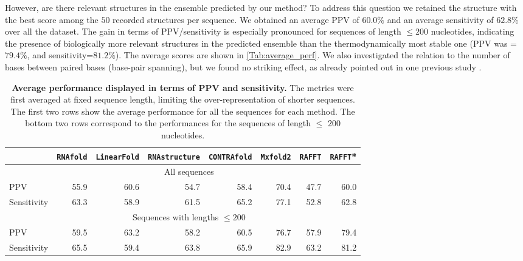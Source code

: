 However, are there relevant structures in the ensemble predicted by our method? To address this question we retained the structure with the best score among the $50$ recorded structures per sequence. We obtained an average \ac{PPV} of $60.0\%$ and an average sensitivity of $62.8\%$ over all the dataset. The gain in terms of \ac{PPV}/sensitivity is especially pronounced for sequences of length $\leq 200$ nucleotides, indicating the presence of biologically more relevant structures in the predicted ensemble than the thermodynamically most stable one (\ac{PPV} was =$79.4\%$, and sensitivity=$81.2\%$). The average scores are shown in \autoref{Tab:average_perf}. We also investigated the relation to the number of bases between paired bases (base-pair spanning), but we found no striking effect, as already pointed out in one previous study \cite{amman13_troub_long_range_base_pairs_rna_foldin}.

\begin{table}[htbp]
	\caption{\label{Tab:average_perf}\textbf{Average performance displayed in terms of \ac{PPV} and sensitivity.} The metrics were first averaged at fixed sequence length, limiting the over-representation of shorter sequences. The first two rows show the average performance for all the sequences for each method. The bottom two rows correspond to the performances for the sequences of length \(\leq\) $200$ nucleotides.}
	\centering
	\hspace*{-1cm}
	\begin{tabular}{lrrrrrrr}
		\hline
		& \texttt{RNAfold} & \texttt{LinearFold} & \texttt{RNAstructure}  & \texttt{CONTRAfold} & \texttt{Mxfold2} & \texttt{RAFFT} & \texttt{RAFFT}* \\
		\hline
		& \multicolumn{6}{c}{All sequences}\\
		\cmidrule{2-8}
		\ac{PPV}         & 55.9 &	60.6 &	54.7 &	58.4 &	70.4 &	47.7 & 60.0 \\
		Sensitivity & 63.3 &	58.9 &	61.5 &	65.2 &	77.1 &	52.8 & 62.8 \\
		\hline
		& \multicolumn{6}{c}{Sequences with lengths \(\leq 200\)}\\
		\cmidrule{2-8}
		\ac{PPV}         & 59.5 &	63.2 &	58.2 &	60.5 &	76.7 &	57.9 & 79.4  \\
		Sensitivity & 65.5 &	59.4 &	63.8 &	65.9 &	82.9 &	63.2 & 81.2 \\
		\hline
		
	\end{tabular}
	
\end{table}


